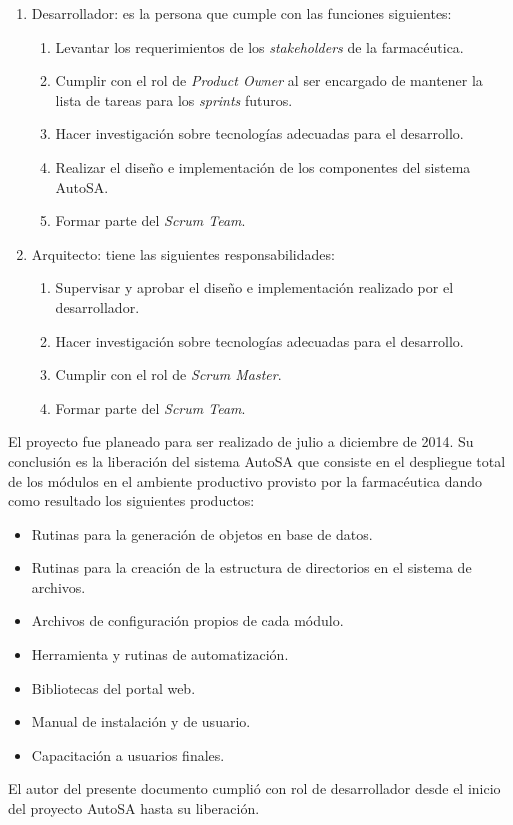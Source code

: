 \begin{enumerate}
	\item Desarrollador: es la persona que cumple con las funciones siguientes:
	\begin{enumerate}
		\item Levantar los requerimientos de los \textit{stakeholders} de la farmacéutica.
		\item Cumplir con el rol de \textit{Product Owner} al ser encargado de mantener la lista de tareas para los \textit{sprints} futuros.
		\item Hacer investigación sobre tecnologías adecuadas para el desarrollo.
		\item Realizar el diseño e implementación de los componentes del sistema AutoSA.
		\item Formar parte del \textit{Scrum Team}.
	\end{enumerate}
	\item Arquitecto: tiene las siguientes responsabilidades:
	\begin{enumerate}
		\item Supervisar y aprobar el diseño e implementación realizado por el desarrollador.
		\item Hacer investigación sobre tecnologías adecuadas para el desarrollo.
		\item Cumplir con el rol de \textit{Scrum Master}.
		\item Formar parte del \textit{Scrum Team}.
	\end{enumerate}
\end{enumerate}
El proyecto fue planeado para ser realizado de julio a diciembre de 2014. Su conclusión es la liberación del sistema AutoSA que consiste en el despliegue total de los módulos en el ambiente productivo provisto por la farmacéutica dando como resultado los siguientes productos:
\begin{itemize}
\item Rutinas para la generación de objetos en base de datos.
\item Rutinas para la creación de la estructura de directorios en el sistema de archivos.
\item Archivos de configuración propios de cada módulo.
\item Herramienta y rutinas de automatización.
\item Bibliotecas del portal web.
\item Manual de instalación y de usuario.
\item Capacitación a usuarios finales.
\end{itemize}
El autor del presente documento cumplió con rol de desarrollador desde el inicio del proyecto AutoSA hasta su liberación.

